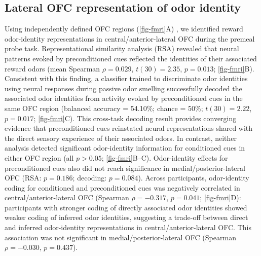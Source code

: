 \documentclass[12pt,letterpaper]{article}
\begin{document}
\label{fig-beh}

\par\endgroup\bigskip




\subsection*{Lateral OFC representation of odor identity}


Using independently defined OFC regions (\autoref{fig-fmri}A) \cite{kahnt2012connectivity}, we identified reward odor-identity representations in central/anterior-lateral OFC during the premeal probe task. Representational similarity analysis (RSA) revealed that neural patterns evoked by preconditioned cues reflected the identities of their associated reward odors (mean Spearman $\rho = 0.029$, $t(30) = 2.35$, $p = 0.013$; \autoref{fig-fmri}B). Consistent with this finding, a classifier trained to discriminate odor identities using neural responses during passive odor smelling successfully decoded the associated odor identities from activity evoked by preconditioned cues in the same OFC region (balanced accuracy = 54.10\%; chance = 50\%; $t(30) = 2.22$, $p = 0.017$; \autoref{fig-fmri}C). This cross-task decoding result provides converging evidence that preconditioned cues reinstated neural representations shared with the direct sensory experience of their associated odors. In contrast, neither analysis detected significant odor-identity information for conditioned cues in either OFC region (all $p > 0.05$; \autoref{fig-fmri}B–C). Odor-identity effects for preconditioned cues also did not reach significance in medial/posterior-lateral OFC (RSA: $p = 0.186$; decoding: $p = 0.084$). Across participants, odor-identity coding for conditioned and preconditioned cues was negatively correlated in central/anterior-lateral OFC (Spearman $\rho = -0.317$, $p = 0.041$; \autoref{fig-fmri}D): participants with stronger coding of directly associated odor identities showed weaker coding of inferred odor identities, suggesting a trade-off between direct and inferred odor-identity representations in central/anterior-lateral OFC. This association was not significant in medial/posterior-lateral OFC (Spearman $\rho = -0.030$, $p = 0.437$).




\par\bigskip\begingroup
{}
\end{document}
